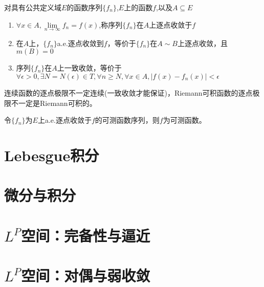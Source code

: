 \documentclass[12pt, a4paper, oneside, UTF8]{ctexbook}
\begin{document}
\begin{defn}
	对具有公共定义域$E$的函数序列$\{f_n\}$,$E$上的函数$f$,以及$A\subseteq E$
	\begin{enumerate}[label=\Roman*]
		\item $\forall x\in A,\lim\limits_{n \to \infty} f_n = f(x)$,称序列$\{f_n\}$在$A$上逐点收敛于$f$
		\item 在$A$上，$\{f_n\}$a.e.逐点收敛到$f$，等价于$\{f_n\}$在$A\sim B$上逐点收敛，且$m(B)=0$
		\item 序列$\{f_n\}$在$A$上一致收敛，等价于$\forall \epsilon >0,\exists N=N(\epsilon) \in T,\forall n\geq N,\forall x\in A,|f(x)-f_n(x)|<\epsilon$
	\end{enumerate}
\end{defn}
	连续函数的逐点极限不一定连续(一致收敛才能保证)，Riemann可积函数的逐点极限不一定是Riemann可积的。
	
\begin{proposition}
	令$\{f_n\}$为$E$上a.e.逐点收敛于$f$的可测函数序列，则$f$为可测函数。
\end{proposition}


\section{Lebesgue积分}



\section{微分与积分}

\section{$L^P$空间：完备性与逼近}



\section{$L^P$空间：对偶与弱收敛}

\ifx\allfiles\undefined
\end{document}
